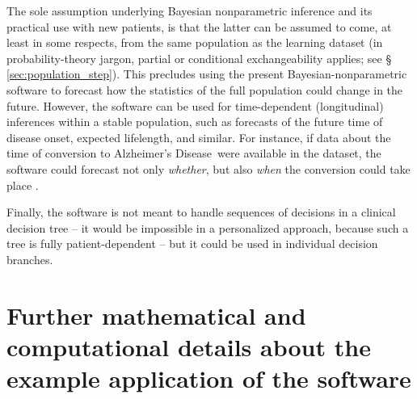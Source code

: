 \documentclass[a4paper,12pt,%
onecolumn,oneside,article,%
british%
]{memoir}
\makeatletter
\theoremstyle{remark}
\theoremstyle{innote}
\gdef\thesection{\@Alph\c@section}%
\renewcommand*{\|}[1][]{\nonscript\:#1\vert\nonscript\:\mathopen{}}
\newcommand*{\sect}{\S}%
\newcommand*{\chap}{ch.}%
\newcommand*{\eg}{{e.g.}}
\newcommand*{\cf}{{cf.}}
\newcommand*{\ad}{Alzheimer's Disease}
\makeatother
\begin{document}
The sole assumption underlying Bayesian nonparametric inference and its practical use with new patients, is that the latter can be assumed to come, at least in some respects, from the same population as the learning dataset (in probability-theory jargon, partial or conditional exchangeability applies; see \sect\,\ref{sec:population_step}). This precludes using the present Bayesian-nonparametric software to forecast how the statistics of the full population could change in the future. However, the software can be used for time-dependent (longitudinal) inferences within a stable population, such as forecasts of the future time of disease onset, expected lifelength, and similar. For instance, if data about the time of conversion to \ad\ were available in the dataset, the software could forecast not only \emph{whether}, but also \emph{when} the conversion could take place \autocites[\cf\ \eg][]{delacruzmesiaetal2007}.

Finally, the software is not meant to handle sequences of decisions in a clinical decision tree \autocites[\chap~6]{soxetal1988_r2013}[\chap~1]{huninketal2001_r2014} -- it would be impossible in a personalized approach, because such a tree is fully patient-dependent -- but it could be used in individual decision branches.


\bigskip%
\appendix
\renewcommand\thesection{\Alph{section}}
\section{Further mathematical and computational details about the example application of the software}
\label{sec:appendices}
\end{document}
